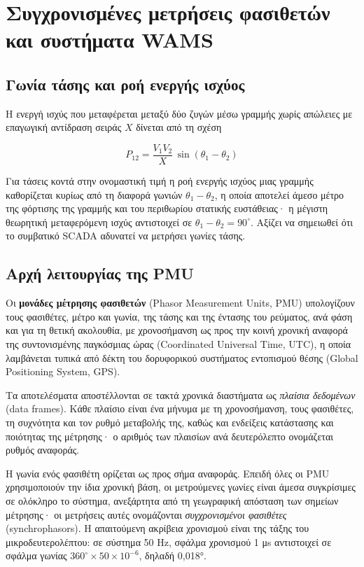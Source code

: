 \section{Συγχρονισμένες μετρήσεις φασιθετών και συστήματα WAMS}

\subsection{Γωνία τάσης και ροή ενεργής ισχύος}

Η ενεργή ισχύς που μεταφέρεται μεταξύ δύο ζυγών μέσω γραμμής χωρίς απώλειες με επαγωγική
αντίδραση σειράς $X$ δίνεται από τη σχέση

\begin{equation}
P_{12} = \frac{V_1 V_2}{X}\,\sin(\theta_1 - \theta_2)
\label{eq:powerflow}
\end{equation}

Για τάσεις κοντά στην ονομαστική τιμή η ροή ενεργής ισχύος μιας γραμμής καθορίζεται κυρίως από τη διαφορά γωνιών $\theta_1 - \theta_2$, η οποία
αποτελεί άμεσο μέτρο της φόρτισης της γραμμής και του περιθωρίου στατικής ευστάθειας· η μέγιστη θεωρητική
μεταφερόμενη ισχύς αντιστοιχεί σε $\theta_1 - \theta_2 = 90^\circ$. Αξίζει να σημειωθεί ότι το συμβατικό SCADA αδυνατεί να μετρήσει
γωνίες τάσης.

\subsection{Αρχή λειτουργίας της PMU}

Οι \textbf{μονάδες μέτρησης φασιθετών} (Phasor Measurement Units, PMU) υπολογίζουν τους
φασιθέτες, μέτρο και γωνία, της τάσης και της έντασης του ρεύματος, ανά φάση και για τη
θετική ακολουθία, με χρονοσήμανση ως προς την κοινή χρονική αναφορά της συντονισμένης
παγκόσμιας ώρας (Coordinated Universal Time, UTC), η οποία λαμβάνεται τυπικά από δέκτη του
δορυφορικού συστήματος εντοπισμού θέσης (Global Positioning System, GPS).

Τα αποτελέσματα αποστέλλονται σε τακτά χρονικά διαστήματα ως \emph{πλαίσια δεδομένων} (data
frames). Κάθε πλαίσιο είναι ένα μήνυμα με τη χρονοσήμανση, τους φασιθέτες, τη συχνότητα και
τον ρυθμό μεταβολής της, καθώς και ενδείξεις κατάστασης και ποιότητας της μέτρησης· ο αριθμός
των πλαισίων ανά δευτερόλεπτο ονομάζεται ρυθμός αναφοράς.

Η γωνία ενός φασιθέτη ορίζεται ως προς σήμα αναφοράς. Επειδή όλες οι PMU χρησιμοποιούν την
ίδια χρονική βάση, οι μετρούμενες γωνίες είναι άμεσα συγκρίσιμες σε ολόκληρο το σύστημα,
ανεξάρτητα από τη γεωγραφική απόσταση των σημείων μέτρησης· οι μετρήσεις αυτές ονομάζονται
\emph{συγχρονισμένοι φασιθέτες} (synchrophasors). Η απαιτούμενη ακρίβεια χρονισμού είναι της
τάξης του μικροδευτερολέπτου: σε σύστημα 50 Hz, σφάλμα χρονισμού 1 μs αντιστοιχεί σε σφάλμα
γωνίας $360^\circ \times 50 \times 10^{-6}$, δηλαδή 0,018°.

